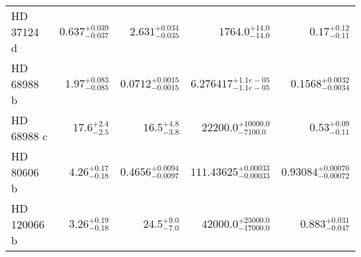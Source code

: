 \begin{longtable*}{lrrrr}
HD 37124 d & $0.637^{+0.039}_{-0.037}$ & $2.631^{+0.034}_{-0.035}$ & $1764.0^{+14.0}_{-14.0}$ & $0.17^{+0.12}_{-0.11}$ \\ 
HD 68988 b & $1.97^{+0.083}_{-0.085}$ & $0.0712^{+0.0015}_{-0.0015}$ & $6.276417^{+1.1e-05}_{-1.1e-05}$ & $0.1568^{+0.0032}_{-0.0034}$ \\ 
HD 68988 c & $17.6^{+2.4}_{-2.5}$ & $16.5^{+4.8}_{-3.8}$ & $22200.0^{+10000.0}_{-7100.0}$ & $0.53^{+0.09}_{-0.11}$ \\ 
HD 80606 b & $4.26^{+0.17}_{-0.18}$ & $0.4656^{+0.0094}_{-0.0097}$ & $111.43625^{+0.00033}_{-0.00033}$ & $0.93084^{+0.00070}_{-0.00072}$ \\ 
HD 120066 b & $3.26^{+0.19}_{-0.18}$ & $24.5^{+9.0}_{-7.0}$ & $42000.0^{+25000.0}_{-17000.0}$ & $0.883^{+0.031}_{-0.047}$ \\ 
\bottomrule 
\end{longtable*} 
